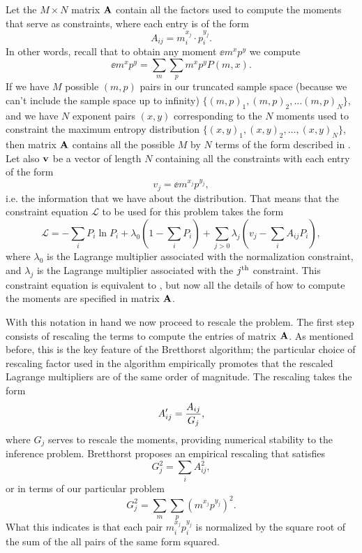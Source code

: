 Let the $M \times N$ matrix $\mathbf{A}$ contain all the factors used to compute the
moments that serve as constraints, where each entry is of the form
\begin{equation}
  A_{ij} = m_i^{x_j} \cdot p_i^{y_j}.
  \label{seq_maxent_rules}
\end{equation}
In other words, recall that to obtain any moment $\ee{m^x p^y}$ we compute
\begin{equation}
  \ee{m^x p^y} = \sum_m \sum_p m^x p^y P(m, x).
\end{equation}
If we have $M$ possible $(m, p)$ pairs in our truncated sample space (because we
can't include the sample space up to infinity) $\{(m, p)_1, (m, p)_2, \ldots (m,
p)_N \}$, and we have $N$ exponent pairs $(x, y)$ corresponding to the $N$
moments used to constraint the maximum entropy distribution $\{(x, y)_1, (x,
y)_2, \ldots, (x, y)_N \}$, then matrix $\mathbf{A}$ contains all the possible $M$
by $N$ terms of the form described in . Let also
$\mathbf{v}$ be a vector of length $N$ containing all the constraints with each
entry of the form
\begin{equation}
  v_j = \ee{m^{x_j} p^{y_j}},
\end{equation}
i.e. the information that we have about the distribution. That means that the
constraint equation $\mathcal{L}$ to be used for this problem takes the form
\begin{equation}
  \mathcal{L} = -\sum_i P_i \ln P_i + \lambda_0 \left( 1 - \sum_i P_i \right)
  + \sum_{j>0} \lambda_j \left( v_j - \sum_i A_{ij} P_i \right),
\end{equation}
where $\lambda_0$ is the Lagrange multiplier associated with the normalization
constraint, and $\lambda_j$ is the Lagrange multiplier associated with the
$j^\text{th}$ constraint. This constraint equation is equivalent to
, but now all the details of how to compute the moments
are specified in matrix $\mathbf{A}$.

With this notation in hand we now proceed to rescale the problem. The first
step consists of rescaling the terms to compute the entries of matrix $\mathbf{A}$.
As mentioned before, this is the key feature of the Bretthorst algorithm; the
particular choice of rescaling factor used in the algorithm empirically promotes
that the rescaled Lagrange multipliers are of the same order of magnitude. The
rescaling takes the form
\begin{equation}
  A_{ij}' = {A_{ij} \over G_j},
\end{equation}
where $G_j$ serves to rescale the moments, providing numerical stability to
the inference problem. Bretthorst proposes an empirical rescaling that satisfies
\begin{equation}
G_j^2 = \sum_i A_{ij}^2,
\end{equation}
or in terms of our particular problem
\begin{equation}
G_j^2 = \sum_m \sum_p \left( m^{x_j} p^{y_j} \right)^2.
\end{equation}
What this indicates is that each pair $m_i^{x_j} p_i^{y_j}$ is normalized by
the square root of the sum of the all pairs of the same form squared.

